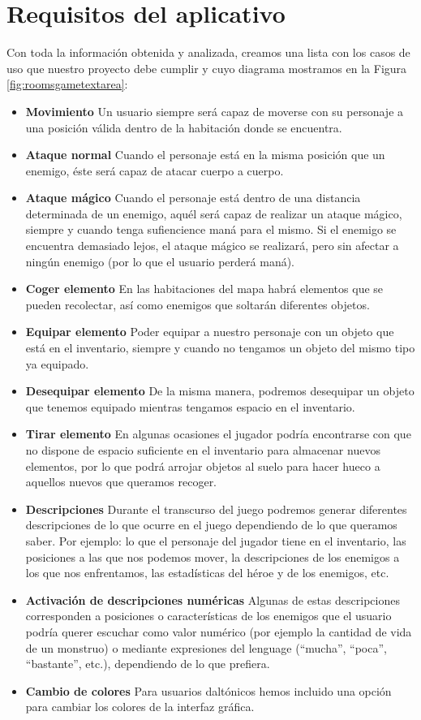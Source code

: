 \section{Requisitos del aplicativo}
Con toda la información obtenida y analizada, creamos una lista con los casos de uso que nuestro proyecto debe cumplir y cuyo diagrama mostramos en la Figura \ref{fig:roomsgametextarea}:

\begin{itemize}
  \item \textbf{Movimiento} Un usuario siempre será capaz de moverse con su personaje a una posición válida dentro de la habitación donde se encuentra. 
  \item \textbf{Ataque normal} Cuando el personaje está en la misma posición que un enemigo, éste será capaz de atacar cuerpo a cuerpo.
  \item \textbf{Ataque mágico} Cuando el personaje está dentro de una distancia determinada de un enemigo, aquél será capaz de realizar un ataque mágico, siempre y cuando tenga sufiencience maná para el mismo. Si el enemigo se encuentra demasiado lejos, el ataque mágico se realizará, pero sin afectar a ningún enemigo (por lo que el usuario perderá maná).
  \item \textbf{Coger elemento} En las habitaciones del mapa habrá elementos que se pueden recolectar, así como enemigos que soltarán diferentes objetos.
  \item \textbf{Equipar elemento} Poder equipar a nuestro personaje con un objeto que está en el inventario, siempre y cuando no tengamos un objeto del mismo tipo ya equipado.
  \item \textbf{Desequipar elemento} De la misma manera, podremos desequipar un objeto que tenemos equipado mientras tengamos espacio en el inventario.
  \item \textbf{Tirar elemento} En algunas ocasiones el jugador podría encontrarse con que no dispone de espacio suficiente en el inventario para almacenar nuevos elementos, por lo que podrá arrojar objetos al suelo para hacer hueco a aquellos nuevos que queramos recoger.
  \item \textbf{Descripciones} Durante el transcurso del juego podremos generar diferentes descripciones de lo que ocurre en el juego dependiendo de lo que queramos saber. Por ejemplo: lo que el personaje del jugador tiene en el inventario, las posiciones a las que nos podemos mover, la descripciones de los enemigos a los que nos enfrentamos, las estadísticas del héroe y de los enemigos, etc.
  \item \textbf{Activación de descripciones numéricas} Algunas de estas descripciones corresponden a posiciones o características de los enemigos que el usuario podría querer escuchar como valor numérico (por ejemplo la cantidad de vida de un monstruo) o mediante expresiones del lenguage (``mucha'', ``poca'', ``bastante'', etc.), dependiendo de lo que prefiera.
  \item \textbf{Cambio de colores} Para usuarios daltónicos hemos incluido una opción para cambiar los colores de la interfaz gráfica.
\end{itemize}

